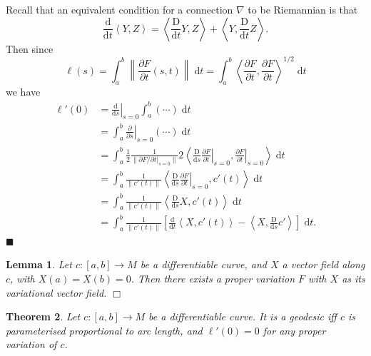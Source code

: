 \documentclass[letter-paper]{tufte-book}
\newtheorem{theorem}{\color{pastel-blue}Theorem}[section]
\newtheorem{lemma}[theorem]{\color{pastel-blue}Lemma}
\newenvironment{proof}[1][Proof]{\begin{trivlist}
\item[\hskip \labelsep {\bfseries #1}]}{\end{trivlist}}
\newcommand{\qed}{\hfill$\blacksquare$}
\newcommand{\qedwhite}{\hfill \ensuremath{\Box}}
\begin{document}
\begin{proof}
  Recall that an equivalent condition for a connection $\nabla$ to be Riemannian is that
  \begin{equation*}
    \frac{\mathrm{d}}{\mathrm{d}t}\left\langle Y, Z\right\rangle = \left\langle \frac{\mathrm{D}}{\mathrm{d}t}Y, Z\right\rangle + \left\langle Y, \frac{\mathrm{D}}{\mathrm{d}t}Z\right\rangle.
  \end{equation*}
  Then since
  \begin{equation*}
    \ell(s) = \int_a^b \left\| \frac{\partial F}{\partial t}(s,t) \right\|\; \mathrm{d}t = \int_a^b \left\langle \frac{\partial F}{\partial t}, \frac{\partial F}{\partial t} \right\rangle^{1/2} \; \mathrm{d}t
  \end{equation*}
  we have
  \begin{align*}
    \ell'(0)
      &= \left.\frac{\mathrm{d}}{\mathrm{d}s}\right|_{s=0} \int_a^b (\cdots)\; \mathrm{d}t \\
      &= \int_a^b \left.\frac{\partial}{\partial s}\right|_{s=0} (\cdots)\; \mathrm{d}t \\
      &= \int_a^b \frac{1}{2}\frac{1}{\|\partial F / \partial t|_{s=0}\|}2 \left\langle \frac{\mathrm{D}}{\mathrm{d}s}\left.\frac{\partial F}{\partial t}\right|_{s=0}, \left.\frac{\partial F}{\partial t}\right|_{s=0} \right\rangle\; \mathrm{d}t\\
      &= \int_a^b \frac{1}{\|c'(t)\|}\left\langle \frac{\mathrm{D}}{\mathrm{d}s}\left.\frac{\partial F}{\partial t}\right|_{s=0}, c'(t) \right\rangle\; \mathrm{d}t\\
      &= \int_a^b \frac{1}{\|c'(t)\|}\left\langle \frac{\mathrm{D}}{\mathrm{d}s}X, c'(t) \right\rangle\; \mathrm{d}t\\
      &= \int_a^b \frac{1}{\|c'(t)\|} \left[\frac{\mathrm{d}}{\mathrm{d}t}\left\langle X, c'(t) \right\rangle - \left\langle X, \frac{\mathrm{D}}{\mathrm{d}s}c'\right\rangle\right]\; \mathrm{d}t.
  \end{align*}
  \qed
\end{proof}

\begin{lemma}
  Let $c:[a,b] \to M$ be a differentiable curve, and $X$ a vector field along $c$, with $X(a) = X(b) = 0$. Then there exists a proper variation $F$ with $X$ as its variational vector field. \qedwhite
\end{lemma}

\begin{theorem}
  Let $c:[a,b] \to M$ be a differentiable curve. It is a geodesic iff $c$ is parameterised proportional to arc length, and $\ell'(0) = 0$ for any proper variation of $c$. 
\end{theorem}
\end{document}

